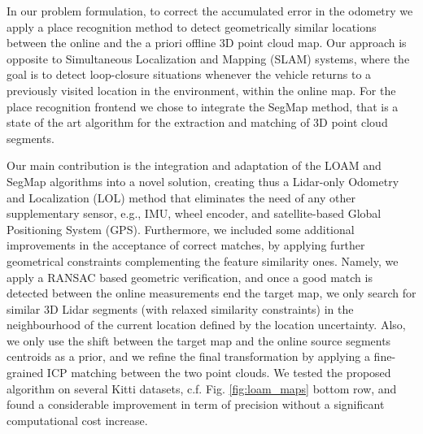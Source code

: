 \documentclass[letterpaper, 10 pt, conference]{ieeeconf}  %
\begin{document}
In our problem formulation, to correct the accumulated error in the odometry we apply a place recognition method to detect geometrically similar locations between the online and the a priori offline 3D point cloud map. Our approach is opposite to Simultaneous Localization and Mapping (SLAM) systems, where the goal is to detect loop-closure situations whenever the vehicle returns to a previously visited location in the environment, within the online map. For the place recognition frontend we chose to integrate the SegMap \cite{segmap} method, that is a state of the art algorithm for the extraction and matching of 3D point cloud segments. 

Our main contribution is the integration and adaptation of the LOAM and SegMap algorithms into a novel solution, creating thus a Lidar-only Odometry and Localization (LOL) method that eliminates the need of any other supplementary sensor, e.g., IMU, wheel encoder, and satellite-based Global Positioning System (GPS). Furthermore, we included some additional improvements in the acceptance of correct matches, by applying further geometrical constraints complementing the feature similarity ones. Namely, we apply a RANSAC based geometric verification, and once a good match is detected between the online measurements end the target map, we only search for similar 3D Lidar segments (with relaxed similarity constraints) in the neighbourhood of the current location defined by the location uncertainty. Also, we only use the shift between the target map and the online source segments centroids as a prior, and we refine the final transformation by applying a fine-grained ICP matching between the two point clouds. We tested the proposed algorithm on several Kitti datasets, c.f. Fig. \ref{fig:loam_maps} bottom row, and found a considerable improvement in term of precision without a significant computational cost increase. 
\end{document}
